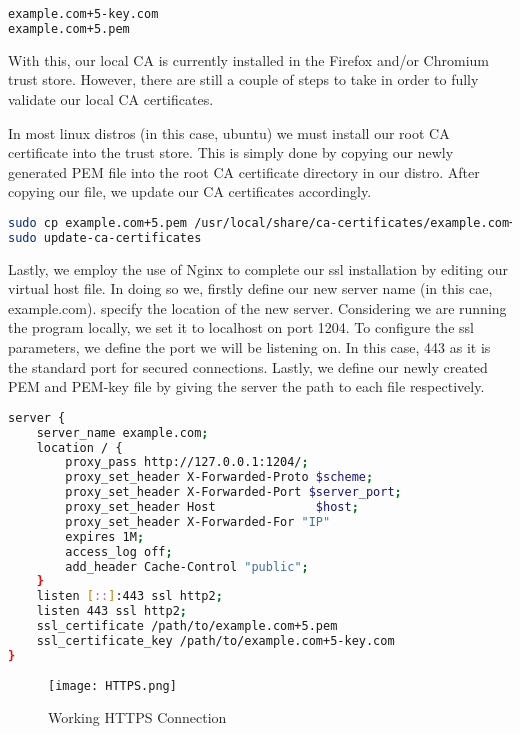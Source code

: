 \documentclass{article}
\begin{document}
\begin{lstlisting}[language=bash]
example.com+5-key.com
example.com+5.pem
\end{lstlisting}

With this, our local CA is currently installed in the Firefox and/or Chromium trust store. However, there are still a couple of steps to take in order to fully validate our local CA certificates.

In most linux distros (in this case, ubuntu) we must install our root CA certificate into the trust store. This is simply done by copying our newly generated PEM file into the root CA certificate directory in our distro. After copying our file, we update our CA certificates accordingly.

\begin{lstlisting}[language=bash]
sudo cp example.com+5.pem /usr/local/share/ca-certificates/example.com+5.crt
sudo update-ca-certificates
\end{lstlisting}

Lastly, we employ the use of Nginx to complete our ssl installation by editing our virtual host file. In doing so we, firstly define our new server name (in this cae, example.com). specify the location of the new server. Considering we are running the program locally, we set it to localhost on port 1204. To configure the ssl parameters, we define the port we will be listening on. In this case, 443 as it is the standard port for secured connections. Lastly, we define our newly created PEM and PEM-key file by giving the server the path to each file respectively.

\begin{lstlisting}[language=bash]
server {
    server_name example.com;
    location / {
        proxy_pass http://127.0.0.1:1204/;
        proxy_set_header X-Forwarded-Proto $scheme;
        proxy_set_header X-Forwarded-Port $server_port;
        proxy_set_header Host              $host;
        proxy_set_header X-Forwarded-For "IP"
        expires 1M;
        access_log off;
        add_header Cache-Control "public";
    }
    listen [::]:443 ssl http2;
    listen 443 ssl http2;
    ssl_certificate /path/to/example.com+5.pem
    ssl_certificate_key /path/to/example.com+5-key.com
}
\end{lstlisting}

\begin{figure}
    \centering
    \texttt{[image: HTTPS.png]}
    \caption{Working HTTPS Connection}
    \label{fig:enter-label}
\end{figure}
\end{document}
